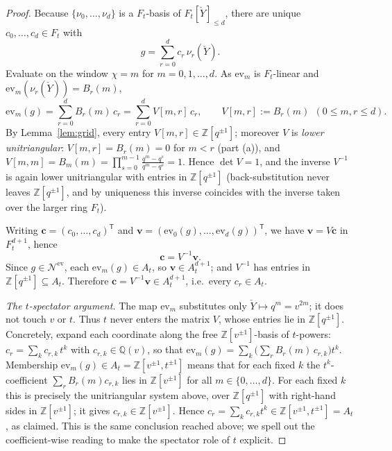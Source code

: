\documentclass[11pt]{article}
\newcommand{\At}{A_t}
\newcommand{\Ft}{F_t}
\newcommand{\Nev}{\mathcal N^{\mathrm{ev}}}
\newcommand{\Yc}{\check Y}
\newcommand{\Z}{\mathbb Z}
\newcommand{\ev}{\mathrm{ev}}
\begin{document}
\begin{proof}
Because $\{\nu_0,\dots,\nu_d\}$ is a $\Ft$-basis of $\Ft[\Yc]_{\le d}$, there are
unique $c_0,\dots,c_d\in\Ft$ with
\[
  g=\sum_{r=0}^{d}c_r\,\nu_r(\Yc).
\]
Evaluate on the window $\chi=m$ for $m=0,1,\dots,d$. As $\ev_m$ is
$\Ft$-linear and $\ev_m(\nu_r(\Yc))=B_r(m)$,
\[
  \ev_m(g)=\sum_{r=0}^{d}B_r(m)\,c_r
  =\sum_{r=0}^{d}V[m,r]\,c_r,
  \qquad V[m,r]:=B_r(m)\ \ (0\le m,r\le d).
\]
By Lemma~\ref{lem:grid}, every entry $V[m,r]\in\Z[q^{\pm1}]$; moreover $V$ is
\emph{lower unitriangular}: $V[m,r]=B_r(m)=0$ for $m<r$ (part (a)), and
$V[m,m]=B_m(m)=\prod_{s=0}^{m-1}\frac{q^{m}-q^{s}}{q^{m}-q^{s}}=1$. Hence
$\det V=1$, and the inverse $V^{-1}$ is again lower unitriangular with entries in
$\Z[q^{\pm1}]$ (back-substitution never leaves $\Z[q^{\pm1}]$, and by uniqueness
this inverse coincides with the inverse taken over the larger ring $\Ft$).

Writing $\mathbf c=(c_0,\dots,c_d)^{\mathsf T}$ and
$\mathbf v=(\ev_0(g),\dots,\ev_d(g))^{\mathsf T}$, we have $\mathbf v=V\mathbf c$
in $\Ft^{d+1}$, hence
\[
  \mathbf c=V^{-1}\mathbf v .
\]
Since $g\in\Nev$, each $\ev_m(g)\in\At$, so $\mathbf v\in\At^{d+1}$; and
$V^{-1}$ has entries in $\Z[q^{\pm1}]\subseteq\At$. Therefore
$\mathbf c=V^{-1}\mathbf v\in\At^{d+1}$, i.e.\ every $c_r\in\At$.

\smallskip
\emph{The $t$-spectator argument.}\;
The map $\ev_m$ substitutes only $\Yc\mapsto q^{m}=v^{2m}$; it does not touch $v$
or $t$. Thus $t$ never enters the matrix $V$, whose entries lie in
$\Z[q^{\pm1}]$. Concretely, expand each coordinate along the free
$\Z[v^{\pm1}]$-basis of $t$-powers: $c_r=\sum_{k}c_{r,k}\,t^{k}$ with
$c_{r,k}\in\mathbb Q(v)$, so that
$\ev_m(g)=\sum_{k}\bigl(\sum_{r}B_r(m)\,c_{r,k}\bigr)t^{k}$. Membership
$\ev_m(g)\in\At=\Z[v^{\pm1},t^{\pm1}]$ means that for each fixed $k$ the
$t^{k}$-coefficient $\sum_r B_r(m)c_{r,k}$ lies in $\Z[v^{\pm1}]$ for all
$m\in\{0,\dots,d\}$. For each fixed $k$ this is precisely the unitriangular
system above, over $\Z[q^{\pm1}]$ with right-hand sides in $\Z[v^{\pm1}]$; it
gives $c_{r,k}\in\Z[v^{\pm1}]$. Hence
$c_r=\sum_k c_{r,k}t^{k}\in\Z[v^{\pm1},t^{\pm1}]=\At$, as claimed. This is the
same conclusion reached above; we spell out the coefficient-wise reading to make
the spectator role of $t$ explicit.


\end{proof}
\end{document}
